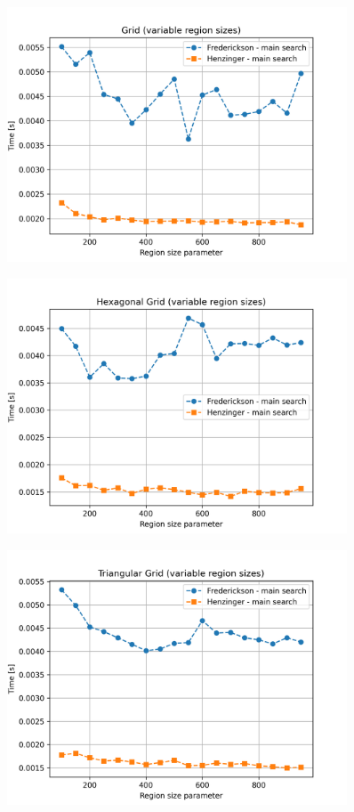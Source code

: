 \begin{figure}[H]
    \centering
    \includegraphics[width=0.9\textwidth]{charts/Pgrid.png}
    \caption{}
    \label{fig:Pgrid}
\end{figure}

\begin{figure}[H]
    \centering
    \includegraphics[width=0.9\textwidth]{charts/Phex.png}
    \caption{}
    \label{fig:Phex}
\end{figure}

\begin{figure}[H]
    \centering
    \includegraphics[width=0.9\textwidth]{charts/Ptrig.png}
    \caption{}
    \label{fig:Ptrig}
\end{figure}

